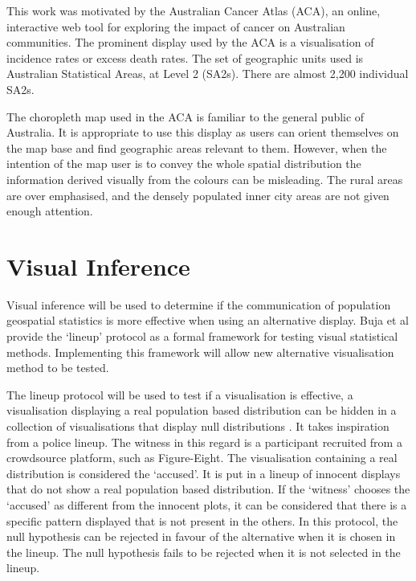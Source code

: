 \documentclass{monashthesis}
\begin{document}
This work was motivated by the Australian Cancer Atlas (ACA), an online, interactive web tool for exploring the impact of cancer on Australian communities. The prominent display used by the ACA is a visualisation of incidence rates or excess death rates. The set of geographic units used is Australian Statistical Areas, at Level 2 (SA2s). There are almost 2,200 individual SA2s.

The choropleth map used in the ACA is familiar to the general public of Australia. It is appropriate to use this display as users can orient themselves on the map base and find geographic areas relevant to them.
However, when the intention of the map user is to convey the whole spatial distribution the information derived visually from the colours can be misleading.
The rural areas are over emphasised, and the densely populated inner city areas are not given enough attention.

\hypertarget{visual-inference}{%
\section{Visual Inference}\label{visual-inference}}

Visual inference will be used to determine if the communication of population geospatial statistics is more effective when using an alternative display.
Buja et al \autocite{GIIV} provide the `lineup' protocol as a formal framework for testing visual statistical methods. Implementing this framework will allow new alternative visualisation method to be tested.

The lineup protocol will be used to test if a visualisation is effective, a visualisation displaying a real population based distribution can be hidden in a collection of visualisations that display null distributions \autocite{chowd}.
It takes inspiration from a police lineup.
The witness in this regard is a participant recruited from a crowdsource platform, such as Figure-Eight.
The visualisation containing a real distribution is considered the `accused'.
It is put in a lineup of innocent displays that do not show a real population based distribution.
If the `witness' chooses the `accused' as different from the innocent plots, it can be considered that there is a specific pattern displayed that is not present in the others.
In this protocol, the null hypothesis can be rejected in favour of the alternative when it is chosen in the lineup. The null hypothesis fails to be rejected when it is not selected in the lineup.
\end{document}
